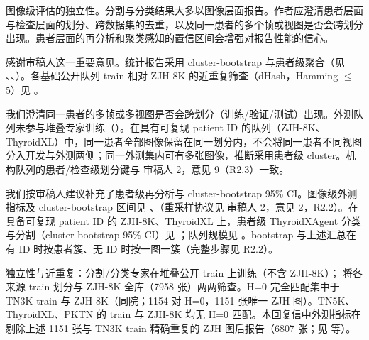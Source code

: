 \begin{reviewercomment}
图像级评估的独立性。分割与分类结果大多以图像层面报告。作者应澄清患者层面与检查层面的划分、跨数据集的去重，以及同一患者的多个帧或视图是否会跨划分出现。患者层面的再分析和聚类感知的置信区间会增强对报告性能的信心。
\end{reviewercomment}
\begin{authorresponse}
感谢审稿人这一重要意见。统计报告采用 cluster-bootstrap 与患者级聚合（见 、、）。各基础公开队列 train 相对 ZJH-8K 的近重复筛查（dHash，Hamming $\leq$ 5）见 。\par
我们澄清同一患者的多帧或多视图是否会跨划分（训练/验证/测试）出现。外测队列未参与堆叠专家训练（）。在具有可复现 patient ID 的队列（ZJH-8K、ThyroidXL）中，同一患者全部图像保留在同一划分内，不会将同一患者不同视图分入开发与外测两侧；同一外测集内可有多张图像，推断采用患者级 cluster。机构队列的患者/检查级划分键与 审稿人 2，意见 9（R2.3）一致。\par
我们按审稿人建议补充了患者级再分析与 cluster-bootstrap 95\% CI。图像级外测指标及 cluster-bootstrap 区间见 、（重采样协议见 审稿人 2，意见 2，R2.2）。在具备可复现 patient ID 的 ZJH-8K、ThyroidXL 上，患者级 ThyroidXAgent 分类与分割（cluster-bootstrap 95\% CI）见 ；队列规模见 。bootstrap 与上述汇总在有 ID 时按患者簇、无 ID 时按一图一簇（完整步骤见 R2.2）。\par
独立性与近重复：分割/分类专家在堆叠公开 train 上训练（不含 ZJH-8K）； 将各来源 train 划分与 ZJH-8K 全库（7958 张）两两筛查。H=0 完全匹配集中于 TN3K train 与 ZJH-8K（同院；1154 对 H=0，1151 张唯一 ZJH 图）。TN5K、ThyroidXL、PKTN 的 train 与 ZJH-8K 均无 H=0 匹配。本回复信中外测指标在剔除上述 1151 张与 TN3K train 精确重复的 ZJH 图后报告（6807 张；见  等）。\par
\par
\end{authorresponse}


